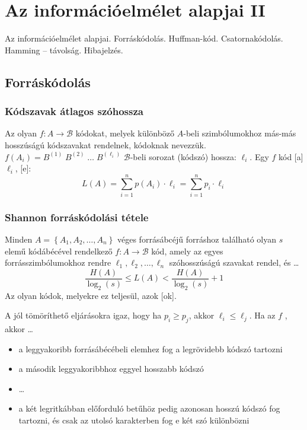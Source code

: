 \documentclass[../main.tex]{subfiles}
\begin{document}
\section{Az információelmélet alapjai II}

\begin{fulltheorem}
  Az információelmélet alapjai. Forráskódolás. Huffman-kód. Csatornakódolás.
  Hamming -- távolság. Hibajelzés.
\end{fulltheorem}

\subsection{Forráskódolás}

\subsubsection*{Kódszavak átlagos szóhossza}

Az olyan $f: A \rightarrow \mathcal{B}$ kódokat, melyek különböző $A$-beli
szimbólumokhoz más-más hosszúságú kódszavakat rendelnek,
 kódoknak nevezzük.
$f(A_i) = B^{(1)} \; B^{(2)} \; \dots \; B^{(\ell_i)}$
$\mathcal{B}$-beli sorozat (kódszó) hossza: ${\ell_i}$.
Egy $f$ kód [a] $\ell_i$,
[e]:
\[
  L(A) = \sum_{i=1}^n p(A_i) \cdot \ell_i =
  \sum_{i=1}^n p_i \cdot\ell_i
\]

\subsubsection*{Shannon forráskódolási tétele}

Minden $A = \left\{ A_1, A_2, \dots , A_n \right\}$
véges forrásábcéjű forráshoz található olyan $s$ elemű
kódábécével rendelkező $f: A \rightarrow \mathcal{B}$
kód, amely az egyes forrásszimbólumokhoz rendre
$\ell_1, \ell_2, \dots, \ell_n$ szóhosszúságú szavakat
rendel, és \dots
\[
  \frac{H(A)}{\log_2(s)}
  \leq L(A)
  < \frac{H(A)}{\log_2(s)} + 1
\]
Az olyan kódok, melyekre ez teljesül, azok [ok].

A jól tömöríthető eljárásokra igaz, hogy ha $p_i \geq p_j$,
akkor $\ell_i \leq \ell_j$. Ha az $f$  ,
akkor \dots
\begin{itemize}
  \item a leggyakoribb forrásábécébeli elemhez
        fog a legrövidebb kódszó tartozni

  \item a második leggyakoribbhoz eggyel hosszabb kódszó

  \item \dots

  \item a két legritkábban előforduló betűhöz
        pedig azonosan hosszú kódszó fog tartozni,
        és csak az utolsó karakterben fog e két szó különbözni
\end{itemize}
\end{document}

